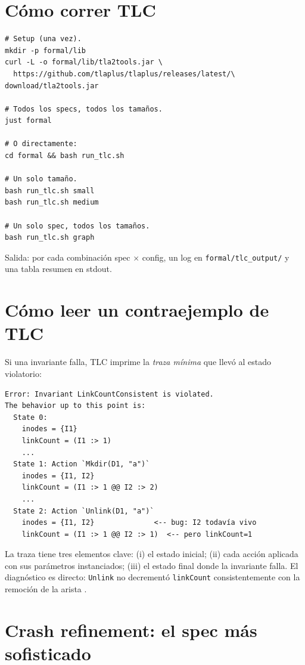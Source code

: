 \section{Cómo correr TLC}

\begin{lstlisting}[language=shellcmd]
# Setup (una vez).
mkdir -p formal/lib
curl -L -o formal/lib/tla2tools.jar \
  https://github.com/tlaplus/tlaplus/releases/latest/\
download/tla2tools.jar

# Todos los specs, todos los tamaños.
just formal

# O directamente:
cd formal && bash run_tlc.sh

# Un solo tamaño.
bash run_tlc.sh small
bash run_tlc.sh medium

# Un solo spec, todos los tamaños.
bash run_tlc.sh graph
\end{lstlisting}

Salida: por cada combinación spec $\times$ config, un log en
\texttt{formal/tlc\_output/} y una tabla resumen en stdout.

\section{Cómo leer un contraejemplo de TLC}

Si una invariante falla, TLC imprime la \emph{traza mínima} que llevó al
estado violatorio:

\begin{lstlisting}[language=shellcmd]
Error: Invariant LinkCountConsistent is violated.
The behavior up to this point is:
  State 0:
    inodes = {I1}
    linkCount = (I1 :> 1)
    ...
  State 1: Action `Mkdir(D1, "a")`
    inodes = {I1, I2}
    linkCount = (I1 :> 1 @@ I2 :> 2)
    ...
  State 2: Action `Unlink(D1, "a")`
    inodes = {I1, I2}              <-- bug: I2 todavía vivo
    linkCount = (I1 :> 1 @@ I2 :> 1)  <-- pero linkCount=1
\end{lstlisting}

La traza tiene tres elementos clave: (i) el estado inicial; (ii) cada
acción aplicada con sus parámetros instanciados; (iii) el estado final
donde la invariante falla. El diagnóstico es directo: \texttt{Unlink}
no decrementó \texttt{linkCount} consistentemente con la remoción de
la arista \econtains.

\section{Crash refinement: el spec más sofisticado}


